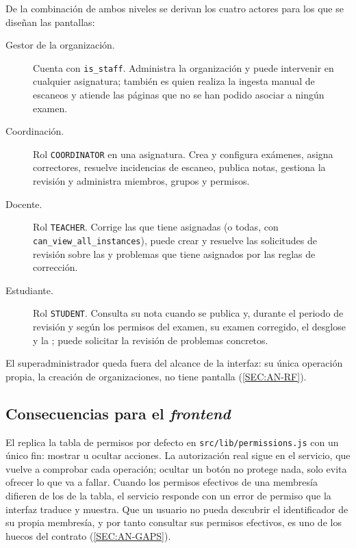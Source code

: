 De la combinación de ambos niveles se derivan los cuatro actores para los que se diseñan
las pantallas:
\begin{description}
  \item[Gestor de la organización.] Cuenta con \texttt{is\_staff}. Administra la
        organización y puede intervenir en cualquier asignatura; también es quien realiza
        la ingesta manual de escaneos y atiende las páginas que no se han podido asociar a
        ningún examen.
  \item[Coordinación.] Rol \texttt{COORDINATOR} en una asignatura. Crea y configura
        exámenes, asigna correctores, resuelve incidencias de escaneo, publica notas,
        gestiona la revisión y administra miembros, grupos y permisos.
  \item[Docente.] Rol \texttt{TEACHER}. Corrige las  que tiene asignadas
        (o todas, con \texttt{can\_view\_all\_instances}), puede crear  y
        resuelve las solicitudes de revisión sobre las  y problemas que
        tiene asignados por las reglas de corrección.
  \item[Estudiante.] Rol \texttt{STUDENT}. Consulta su nota cuando se publica y, durante
        el periodo de revisión y según los permisos del examen, su examen corregido, el
        desglose y la ; puede solicitar la revisión de problemas concretos.
\end{description}
El superadministrador queda fuera del alcance de la interfaz: su única operación propia, la
creación de organizaciones, no tiene pantalla (\cref{SEC:AN-RF}).

\subsection{Consecuencias para el \textit{frontend}}

El  replica la tabla de permisos por defecto en
\texttt{src/lib/permissions.js} con un único fin: mostrar u ocultar acciones. La
autorización real sigue en el servicio, que vuelve a comprobar cada operación; ocultar un
botón no protege nada, solo evita ofrecer lo que va a fallar. Cuando los permisos efectivos
de una membresía difieren de los de la tabla, el servicio responde con un error de permiso
que la interfaz traduce y muestra. Que un usuario no pueda descubrir el identificador de su
propia membresía, y por tanto consultar sus permisos efectivos, es uno de los huecos del
contrato (\cref{SEC:AN-GAPS}).
